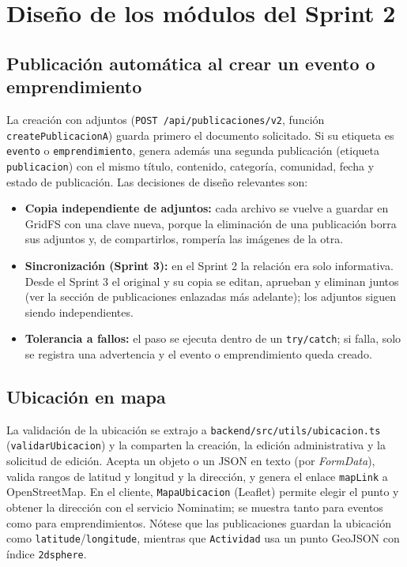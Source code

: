 \section{Diseño de los módulos del Sprint 2}

\subsection{Publicación automática al crear un evento o emprendimiento}
La creación con adjuntos (\texttt{POST /api/publicaciones/v2}, función \texttt{createPublicacionA}) guarda primero el documento solicitado. Si su etiqueta es \texttt{evento} o \texttt{emprendimiento}, genera además una segunda publicación (etiqueta \texttt{publicacion}) con el mismo título, contenido, categoría, comunidad, fecha y estado de publicación. Las decisiones de diseño relevantes son:
\begin{itemize}
    \item \textbf{Copia independiente de adjuntos:} cada archivo se vuelve a guardar en GridFS con una clave nueva, porque la eliminación de una publicación borra sus adjuntos y, de compartirlos, rompería las imágenes de la otra.
    \item \textbf{Sincronización (Sprint 3):} en el Sprint 2 la relación era solo informativa. Desde el Sprint 3 el original y su copia se editan, aprueban y eliminan juntos (ver la sección de publicaciones enlazadas más adelante); los adjuntos siguen siendo independientes.
    \item \textbf{Tolerancia a fallos:} el paso se ejecuta dentro de un \texttt{try/catch}; si falla, solo se registra una advertencia y el evento o emprendimiento queda creado.
\end{itemize}

\subsection{Ubicación en mapa}
La validación de la ubicación se extrajo a \texttt{backend/src/utils/ubicacion.ts} (\texttt{validarUbicacion}) y la comparten la creación, la edición administrativa y la solicitud de edición. Acepta un objeto o un JSON en texto (por \textit{FormData}), valida rangos de latitud y longitud y la dirección, y genera el enlace \texttt{mapLink} a OpenStreetMap. En el cliente, \texttt{MapaUbicacion} (Leaflet) permite elegir el punto y obtener la dirección con el servicio Nominatim; se muestra tanto para eventos como para emprendimientos. Nótese que las publicaciones guardan la ubicación como \texttt{latitude}/\texttt{longitude}, mientras que \texttt{Actividad} usa un punto GeoJSON con índice \texttt{2dsphere}.

